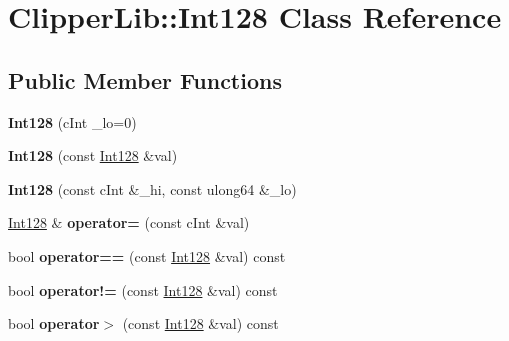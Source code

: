 \hypertarget{classClipperLib_1_1Int128}{}\section{Clipper\+Lib\+:\+:Int128 Class Reference}
\label{classClipperLib_1_1Int128}
\subsection*{Public Member Functions}
\begin{DoxyCompactItemize}
\item 
\mbox{\label{classClipperLib_1_1Int128_a53bbc3ca7c7db0a275d8c5177f53223a}} 
{\bfseries Int128} (c\+Int \+\_\+lo=0)
\item 
\mbox{\label{classClipperLib_1_1Int128_ad113c3dc3bd371984b05fddb1fe527e2}} 
{\bfseries Int128} (const \hyperlink{classClipperLib_1_1Int128}{Int128} \&val)
\item 
\mbox{\label{classClipperLib_1_1Int128_a0af39e880d19234dfb172a17b7a2d04c}} 
{\bfseries Int128} (const c\+Int \&\+\_\+hi, const ulong64 \&\+\_\+lo)
\item 
\mbox{\label{classClipperLib_1_1Int128_aa36a227b826ea6c79c37d8acc29f131d}} 
\hyperlink{classClipperLib_1_1Int128}{Int128} \& {\bfseries operator=} (const c\+Int \&val)
\item 
\mbox{\label{classClipperLib_1_1Int128_a8946a96471d06371fd5ea4f4f65cb4c9}} 
bool {\bfseries operator==} (const \hyperlink{classClipperLib_1_1Int128}{Int128} \&val) const
\item 
\mbox{\label{classClipperLib_1_1Int128_ae7437e8f6dcb611e8b33e5e7c9c8fbc0}} 
bool {\bfseries operator!=} (const \hyperlink{classClipperLib_1_1Int128}{Int128} \&val) const
\item 
\mbox{\label{classClipperLib_1_1Int128_ac3d844564066e223483f9393ba050daa}} 
bool {\bfseries operator$>$} (const \hyperlink{classClipperLib_1_1Int128}{Int128} \&val) const
\item 
\mbox{\label{classClipperLib_1_1Int128_ab55bb6a363e7ced8e5e64a1eefac6000}} 

\end{DoxyCompactItemize}
